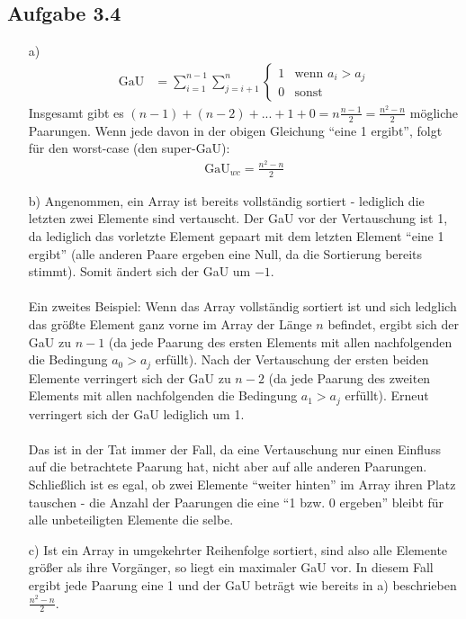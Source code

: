 \documentclass{article}
\begin{document}
    \subsection*{Aufgabe 3.4}
    \begin{enumerate}
        \item[a)]
        \begin{align*}
            \mathrm{GaU} &= \sum_{i=1}^{n-1} \sum_{j=i+1}^{n} \begin{cases}
                1 & \text{wenn } a_i > a_j \\
                0 & \text{sonst}
            \end{cases}
        \end{align*}
        Insgesamt gibt es $(n-1) + (n-2) + ... + 1 + 0 = n \frac{n-1}{2} = \frac{n^2-n}{2}$ mögliche Paarungen. Wenn jede davon in der obigen Gleichung "`eine 1 ergibt"', folgt für den worst-case (den super-GaU):
        \begin{align*}
            \mathrm{GaU}_{wc} = \frac{n^2-n}{2}
        \end{align*}
        \item[b)] Angenommen, ein Array ist bereits vollständig sortiert - lediglich die letzten zwei Elemente sind vertauscht. Der GaU vor der Vertauschung ist 1, da lediglich das vorletzte Element gepaart mit dem letzten Element "`eine 1 ergibt"' (alle anderen Paare ergeben eine Null, da die Sortierung bereits stimmt). Somit ändert sich der GaU um $-1$. \\\\
        Ein zweites Beispiel: Wenn das Array vollständig sortiert ist und sich ledglich das größte Element ganz vorne im Array der Länge $n$ befindet, ergibt sich der GaU zu $n-1$ (da jede Paarung des ersten Elements mit allen nachfolgenden die Bedingung $a_0 > a_j$ erfüllt). Nach der Vertauschung der ersten beiden Elemente verringert sich der GaU zu $n-2$ (da jede Paarung des zweiten Elements mit allen nachfolgenden die Bedingung $a_1 > a_j$ erfüllt). Erneut verringert sich der GaU lediglich um 1. \\\\
        Das ist in der Tat immer der Fall, da eine Vertauschung nur einen Einfluss auf die betrachtete Paarung hat, nicht aber auf alle anderen Paarungen. Schließlich ist es egal, ob zwei Elemente "`weiter hinten"' im Array ihren Platz tauschen - die Anzahl der Paarungen die eine "`1 bzw. 0 ergeben"' bleibt für alle unbeteiligten Elemente die selbe. 
        \item[c)] Ist ein Array in umgekehrter Reihenfolge sortiert, sind also alle Elemente größer als ihre Vorgänger, so liegt ein maximaler GaU vor. In diesem Fall ergibt jede Paarung eine 1 und der GaU beträgt wie bereits in a) beschrieben $\frac{n^2-n}{2}$.

\end{enumerate}
\end{document}
